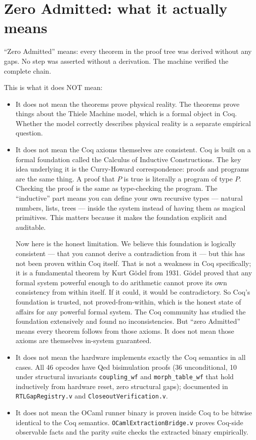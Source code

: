 \documentclass[11pt,a4paper]{article}
\theoremstyle{plain}
\theoremstyle{definition}
\theoremstyle{remark}
\begin{document}
\section{Zero Admitted: what it actually means}
\label{sec:zeroadmit}

``Zero Admitted'' means: every theorem in the proof tree was derived without any gaps. No step was asserted without a derivation. The machine verified the complete chain.

This is what it does NOT mean:
\begin{itemize}
\item It does not mean the theorems prove physical reality. The theorems prove things about the Thiele Machine model, which is a formal object in Coq. Whether the model correctly describes physical reality is a separate empirical question.
\item It does not mean the Coq axioms themselves are consistent. Coq is built on a formal foundation called the Calculus of Inductive Constructions. The key idea underlying it is the Curry-Howard correspondence: proofs and programs are the same thing. A proof that $P$ is true is literally a program of type $P$. Checking the proof is the same as type-checking the program. The ``inductive'' part means you can define your own recursive types --- natural numbers, lists, trees --- inside the system instead of having them as magical primitives. This matters because it makes the foundation explicit and auditable.

Now here is the honest limitation. We believe this foundation is logically consistent --- that you cannot derive a contradiction from it --- but this has not been proven within Coq itself. That is not a weakness in Coq specifically; it is a fundamental theorem by Kurt Gödel from 1931. Gödel proved that any formal system powerful enough to do arithmetic cannot prove its own consistency from within itself. If it could, it would be contradictory. So Coq's foundation is trusted, not proved-from-within, which is the honest state of affairs for any powerful formal system. The Coq community has studied the foundation extensively and found no inconsistencies. But ``zero Admitted'' means every theorem follows from those axioms. It does not mean those axioms are themselves in-system guaranteed.
\item It does not mean the hardware implements exactly the Coq semantics in all cases. All 46 opcodes have Qed bisimulation proofs (36 unconditional, 10 under structural invariants \texttt{coupling\_wf} and \texttt{morph\_table\_wf} that hold inductively from hardware reset, zero structural gaps); documented in \texttt{RTLGapRegistry.v} and \texttt{CloseoutVerification.v}.
\item It does not mean the OCaml runner binary is proven inside Coq to be bitwise identical to the Coq semantics. \texttt{OCamlExtractionBridge.v} proves Coq-side observable facts and the parity suite checks the extracted binary empirically.
\end{itemize}
\end{document}
